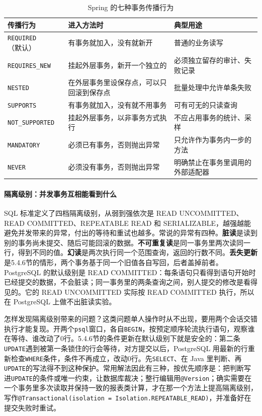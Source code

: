 \begin{table}[htbp]
\centering
\small
\caption{Spring 的七种事务传播行为}
\label{tab:ch05-propagation}
\begin{tabular}{p{}p{}p{}}
\toprule
传播行为 & 进入方法时 & 典型用途 \\
\midrule
\texttt{REQUIRED}（默认） & 有事务就加入，没有就新开 & 普通的业务读写 \\
\texttt{REQUIRES\_NEW} & 挂起外层事务，新开一个独立的 & 必须独立留存的审计、失败记录 \\
\texttt{NESTED} & 在外层事务里设保存点，可以只回滚到保存点 & 批量处理中允许单条失败 \\
\texttt{SUPPORTS} & 有事务就加入，没有就不用事务 & 可有可无的只读查询 \\
\texttt{NOT\_SUPPORTED} & 挂起外层事务，以非事务方式执行 & 不应占用事务的统计、采样 \\
\texttt{MANDATORY} & 必须已有事务，否则抛出异常 & 只允许作为事务内一步的方法 \\
\texttt{NEVER} & 必须没有事务，否则抛出异常 & 明确禁止在事务里调用的外部适配器 \\
\bottomrule
\end{tabular}
\end{table}

\paragraph{隔离级别：并发事务互相能看到什么}SQL 标准定义了四档隔离级别，从弱到强依次是 READ UNCOMMITTED、READ COMMITTED、REPEATABLE READ 和 SERIALIZABLE，越强越能避免并发带来的异常，付出的等待和重试也越多。常说的异常有四种。\textbf{脏读}是读到别的事务尚未提交、随后可能回滚的数据。\textbf{不可重复读}是同一事务里两次读同一行，得到不同的值。\textbf{幻读}是两次执行同一个范围查询，返回的行数不同。\textbf{丢失更新}是5.4.6节的情形，两个事务基于同一个旧值各自写回，后者盖掉前者。PostgreSQL 的默认级别是 READ COMMITTED：每条语句只看得到语句开始时已经提交的数据，不会脏读；同一事务里的两条查询之间，别人提交的修改是看得见的。它的 READ UNCOMMITTED 实际按 READ COMMITTED 执行，所以在 PostgreSQL 上做不出脏读实验。

怎样发现隔离级别带来的问题？这类问题单人操作时从不出现，要用两个会话交错执行才能复现。开两个\texttt{psql}窗口，各自\texttt{BEGIN}，按预定顺序轮流执行语句，观察谁在等待、谁改动了0行。5.4.6节的条件更新在默认级别下就是安全的：第二条\texttt{UPDATE}遇到被第一条锁住的行会等待，对方提交以后，PostgreSQL 用最新的行重新检查\texttt{WHERE}条件，条件不再成立，改动0行。先\texttt{SELECT}、在 Java 里判断、再\texttt{UPDATE}的写法得不到这种保护。常用解法因此有三种，按优先顺序是：把判断写进\texttt{UPDATE}的条件或唯一约束，让数据库裁决；整行编辑用\texttt{@Version}；确实需要在一个事务里多次读取并保持一致的报表类计算，才在那一个方法上提高隔离级别，写作\texttt{@Transactional(isolation = Isolation.REPEATABLE\_READ)}，并准备好在提交失败时重试。

